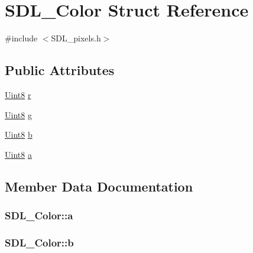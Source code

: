 \hypertarget{struct_s_d_l___color}{}\section{S\+D\+L\+\_\+\+Color Struct Reference}
\label{struct_s_d_l___color}


{\ttfamily \#include $<$S\+D\+L\+\_\+pixels.\+h$>$}

\subsection*{Public Attributes}
\begin{DoxyCompactItemize}
\item 
\hyperlink{_s_d_l__stdinc_8h_a2944638813a090aa23e62f4da842c3e2}{Uint8} \hyperlink{struct_s_d_l___color_a0bb975b6829524133fdd3c6060cfa63d}{r}
\item 
\hyperlink{_s_d_l__stdinc_8h_a2944638813a090aa23e62f4da842c3e2}{Uint8} \hyperlink{struct_s_d_l___color_ae29d881bf740cfa7078b36e07f85d298}{g}
\item 
\hyperlink{_s_d_l__stdinc_8h_a2944638813a090aa23e62f4da842c3e2}{Uint8} \hyperlink{struct_s_d_l___color_a3b79a27e0414049559aa5bcf241dedd3}{b}
\item 
\hyperlink{_s_d_l__stdinc_8h_a2944638813a090aa23e62f4da842c3e2}{Uint8} \hyperlink{struct_s_d_l___color_ac497ba67af6ecb4d51bdd0945b314526}{a}
\end{DoxyCompactItemize}


\subsection{Member Data Documentation}
\subsubsection[{\texorpdfstring{a}{a}}]{ S\+D\+L\+\_\+\+Color\+::a}\hypertarget{struct_s_d_l___color_ac497ba67af6ecb4d51bdd0945b314526}{}\label{struct_s_d_l___color_ac497ba67af6ecb4d51bdd0945b314526}
\subsubsection[{\texorpdfstring{b}{b}}]{ S\+D\+L\+\_\+\+Color\+::b}\hypertarget{struct_s_d_l___color_a3b79a27e0414049559aa5bcf241dedd3}{}\label{struct_s_d_l___color_a3b79a27e0414049559aa5bcf241dedd3}
